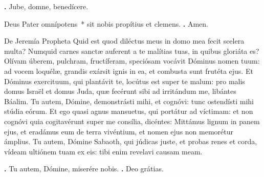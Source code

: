 \begin{small}
\textbf{\Vbar.} Jube, domne, benedícere.

Deus Pater omnípotens~* sit nobis propítius et clemens. \textbf{\Rbar.} Amen.
\end{small}


De Jeremía Propheta
Quid est quod diléctus meus in domo mea fecit scelera multa? Numquid carnes sanctæ auferent a te malítias tuas, in quibus gloriáta es?
Olívam úberem, pulchram, fructíferam, speciósam vocávit Dóminus nomen tuum: ad vocem loquélæ, grandis exársit ignis in ea, et combusta sunt frutéta ejus.
Et Dóminus exercituum, qui plantávit te, locútus est super te malum: pro malis domus Israël et domus Juda, quæ fecérunt sibi ad irritándum me, libántes Báalim.
Tu autem, Dómine, demonstrásti mihi, et cognóvi: tunc ostendísti mihi stúdia eórum.
Et ego quasi agnus mansuetus, qui portátur ad víctimam: et non cognóvi quia cogitavérunt super me consília, dicéntes: Mittámus lignum in panem ejus, et eradámus eum de terra vivéntium, et nomen ejus non memorétur ámplius.
Tu autem, Dómine Sabaoth, qui júdicas juste, et probas renes et corda, vídeam ultiónem tuam ex eis: tibi enim revelavi causam meam.

\textbf{\Vbar.} Tu autem, Dómine, miserére nobis.
\textbf{\Rbar.} Deo grátias.

